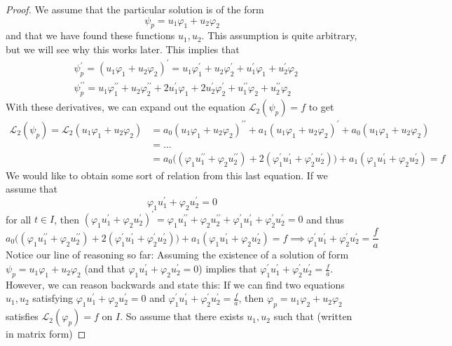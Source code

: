 \documentclass{article}
\theoremstyle{remark}
\theoremstyle{definition}
\begin{document}
      \begin{proof}
      We assume that the particular solution is of the form 
      \[\psi_p = u_1 \varphi_1 + u_2 \varphi_2\]
      and that we have found these functions $u_1, u_2$. This assumption is quite arbitrary, but we will see why this works later. This implies that
      \begin{align*}
          &\psi_p^\prime = (u_1 \varphi_1 + u_2 \varphi_2)^\prime  = u_1 \varphi_1^\prime + u_2 \varphi_2^\prime + u_1^\prime \varphi_1 + u_2^\prime \varphi_2 \\
          & \psi_p^{\prime \prime} = u_1 \varphi_1^{\prime \prime} + u_2 \varphi_2^{\prime \prime} + 2 u_1^\prime \varphi_1 + 2 u_2^\prime \varphi_2^\prime + u_1^{\prime \prime} \varphi_2 + u_2^{\prime \prime} \varphi_2
      \end{align*}
      With these derivatives, we can expand out the equation $\mathcal{L}_2 (\psi_p) = f$ to get
      \begin{align*}
          \mathcal{L}_2(\psi_p) = \mathcal{L}_2 (u_1 \varphi_1 + u_2 \varphi_2) & = a_0 (u_1 \varphi_1 + u_2 \varphi_2)^{\prime\prime} + a_1 (u_1 \varphi_1 + u_2 \varphi_2)^{\prime} + a_0 (u_1 \varphi_1 + u_2 \varphi_2) \\
          & = ... \\
          & = a_0 \big( (\varphi_1 u_1^{\prime\prime} + \varphi_2 u_2^{\prime \prime}) + 2(\varphi_1^\prime u_1^\prime + \varphi_2^\prime u_2^\prime)\big) + a_1 (\varphi_1 u_1^\prime + \varphi_2 u_2^\prime) = f
      \end{align*}
      We would like to obtain some sort of relation from this last equation. If we assume that 
      \[\varphi_1 u_1^\prime + \varphi_2 u_2^\prime = 0\]
      for all $t \in I$, then $(\varphi_1 u_1^\prime + \varphi_2 u_2^\prime)^\prime = \varphi_1 u_1^{\prime\prime} + \varphi_2 u_2^{\prime\prime} + \varphi_1^\prime u_1^{\prime} + \varphi_2^\prime u_2^{\prime} = 0$ and thus
      \[a_0 \big( (\varphi_1 u_1^{\prime\prime} + \varphi_2 u_2^{\prime \prime}) + 2(\varphi_1^\prime u_1^\prime + \varphi_2^\prime u_2^\prime)\big) + a_1 (\varphi_1 u_1^\prime + \varphi_2 u_2^\prime) = f \implies \varphi_1^\prime u_1^\prime + \varphi_2^\prime u_2^\prime = \frac{f}{a}\]
      Notice our line of reasoning so far: Assuming the existence of a solution of form $\psi_p = u_1 \varphi_1 + u_2 \varphi_2$ (and that $\varphi_1 u_1^\prime + \varphi_2 u_2^\prime = 0$) implies that $\varphi_1^\prime u_1^\prime + \varphi_2^\prime u_2^\prime = \frac{f}{a}$. However, we can reason backwards and state this: If we can find two equations $u_1, u_2$ satisfying $\varphi_1 u_1^\prime + \varphi_2 u_2^\prime = 0$ and $\varphi_1^\prime u_1^\prime + \varphi_2^\prime u_2^\prime = \frac{f}{a}$, then $\varphi_p = u_1 \varphi_2 + u_2 \varphi_2$ satisfies $\mathcal{L}_2 (\varphi_p) = f$ on $I$. So assume that there exists $u_1, u_2$ such that (written in matrix form)

\end{proof}
\end{document}
